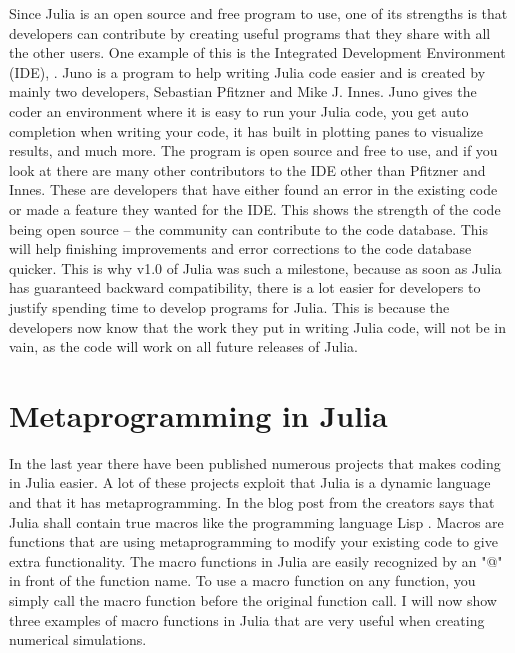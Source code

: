 Since Julia is an open source and free program to use, one of its strengths is that developers can contribute by creating useful programs that they share with all the other users. One example of this is the Integrated Development Environment (IDE), \cite{JunoIDE}. Juno is a program to help writing Julia code easier and is created by mainly two developers, Sebastian Pfitzner and Mike J. Innes. Juno gives the coder an environment where it is easy to run your Julia code, you get auto completion when writing your code, it has built in plotting panes to visualize results, and much more. The program is open source and free to use, and if you look at \cite{JunoGithub} there are many other contributors to the IDE other than Pfitzner and Innes. These are developers that have either found an error in the existing code or made a feature they wanted for the IDE. This shows the strength of the code being open source -- the community can contribute to the code database. This will help finishing improvements and error corrections to the code database quicker. This is why v1.0 of Julia was such a milestone, because as soon as Julia has guaranteed backward compatibility, there is a lot easier for developers to justify spending time to develop programs for Julia. This is because the developers now know that the work they put in writing Julia code, will not be in vain, as the code will work on all future releases of Julia. 

\section{Metaprogramming in Julia}
\label{sec:Metaprogramming}
In the last year there have been published numerous projects that makes coding in Julia easier. A lot of these projects exploit that Julia is a dynamic language and that it has metaprogramming. In the blog post from \cite{juliaBlogRelease2012} the creators says that Julia shall contain true macros like the programming language Lisp \emph{\citep{Lisp}}. Macros are functions that are using metaprogramming to modify your existing code to give extra functionality. The macro functions in Julia are easily recognized by an "@" in front of the function name. To use a macro function on any function, you simply call the macro function before the original function call. I will now show three examples of macro functions in Julia that are very useful when creating numerical simulations.
